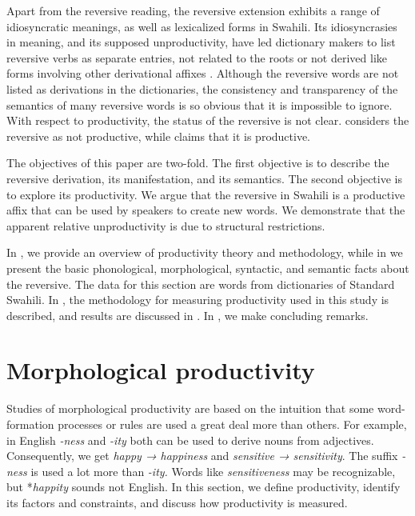 \documentclass[output=paper]{langsci/langscibook}
\begin{document}
Apart from the reversive reading, the reversive extension exhibits a range of idiosyncratic meanings, as well as lexicalized forms in Swahili. Its idiosyncrasies in meaning, and its supposed unproductivity, have led dictionary makers to list reversive verbs as separate entries, not related to the roots or not derived like forms involving other derivational affixes \citep[for example][]{TUKI2001,TUKI2004,Mdeeetal2009}. Although the reversive words are not listed as derivations in the dictionaries, the consistency and transparency of the semantics of many reversive words is so obvious that it is impossible to ignore. With respect to productivity, the status of the reversive is not clear. \citet{Shepardson1986} considers the reversive as not productive, while \citet{Schadeberg1973} claims that it is productive. 

The objectives of this paper are two-fold. The first objective is to describe the reversive derivation, its manifestation, and its semantics. The second objective is to explore its productivity. We argue that the reversive in Swahili is a productive affix that can be used by speakers to create new words. We demonstrate that the apparent relative unproductivity is due to structural restrictions.

In , we provide an overview of productivity theory and methodology, while in  we present the basic phonological, morphological, syntactic, and semantic facts about the reversive. The data for this section are words from dictionaries of Standard Swahili. In , the methodology for measuring productivity used in this study is described, and results are discussed in . In , we make concluding remarks.

\section{Morphological productivity} \label{sec:ngonyaningowa:2}

Studies of morphological productivity are based on the intuition that some word-formation processes or rules are used a great deal more than others. For example, in English \textit{{}-ness} and \textit{{}-ity} both can be used to derive nouns from adjectives. Consequently, we get \textit{happy → happiness} and\textit{ sensitive → sensitivity}. The suffix \textit{{}-ness} is used a lot more than \textit{{}-ity.} Words like \textit{sensitiveness} may be recognizable, but *\textit{happity} sounds not English. In this section, we define productivity, identify its factors and constraints, and discuss how productivity is measured. 
\end{document}

